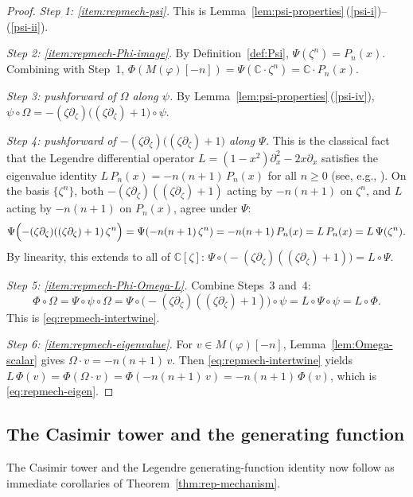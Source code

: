 \documentclass[12pt]{amsart}
\theoremstyle{plain}
\theoremstyle{definition}
\newcommand{\CC}{\mathbb{C}}
\newcommand{\Mf}{M(\varphi)}          %
\newcommand{\Om}{\Omega}              %
\begin{document}
\begin{proof}
\emph{Step 1: \ref{item:repmech-psi}.}
This is Lemma~\ref{lem:psi-properties}\,(\ref{psi-i})--(\ref{psi-ii}).

\emph{Step 2: \ref{item:repmech-Phi-image}.}
By Definition~\ref{def:Psi}, $\Psi(\zeta^n) = P_n(x)$. Combining with Step~1,
$\Phi(\Mf[-n]) = \Psi(\CC\cdot \zeta^n) = \CC\cdot P_n(x)$.

\emph{Step 3: pushforward of $\Om$ along $\psi$.}
By Lemma~\ref{lem:psi-properties}\,(\ref{psi-iv}),
$\psi\circ\Om = -(\zeta\partial_\zeta)\bigl((\zeta\partial_\zeta)+1\bigr)\circ\psi$.

\emph{Step 4: pushforward of $-(\zeta\partial_\zeta)\bigl((\zeta\partial_\zeta)+1\bigr)$
along $\Psi$.}
This is the classical fact that the Legendre differential operator
$L = (1-x^2)\partial_x^2 - 2x\partial_x$ satisfies the eigenvalue identity
$L\,P_n(x) = -n(n+1)\,P_n(x)$ for all $n\geq 0$
(see, e.g., \cite[Ch.~12, eq.~12.3.6]{Whittaker1927}).
On the basis $\{\zeta^n\}$, both
$-(\zeta\partial_\zeta)((\zeta\partial_\zeta)+1)$ acting by $-n(n+1)$ on $\zeta^n$, and
$L$ acting by $-n(n+1)$ on $P_n(x)$, agree under $\Psi$:
\[
  \Psi\Bigl(-(\zeta\partial_\zeta)((\zeta\partial_\zeta)+1)\,\zeta^n\Bigr)
  = \Psi(-n(n+1)\,\zeta^n)
  = -n(n+1)\,P_n(x)
  = L\,P_n(x)
  = L\,\Psi(\zeta^n).
\]
By linearity, this extends to all of $\CC[\zeta]$:
$\Psi\circ \bigl(-(\zeta\partial_\zeta)((\zeta\partial_\zeta)+1)\bigr) = L\circ\Psi$.

\emph{Step 5: \ref{item:repmech-Phi-Omega-L}.}
Combine Steps~3 and~4:
\[
  \Phi\circ\Om
  = \Psi\circ\psi\circ\Om
  = \Psi\circ\bigl(-(\zeta\partial_\zeta)((\zeta\partial_\zeta)+1)\bigr)\circ\psi
  = L\circ\Psi\circ\psi
  = L\circ\Phi.
\]
This is \eqref{eq:repmech-intertwine}.

\emph{Step 6: \ref{item:repmech-eigenvalue}.}
For $v\in\Mf[-n]$, Lemma~\ref{lem:Omega-scalar} gives $\Om\cdot v = -n(n+1)\,v$.
Then \eqref{eq:repmech-intertwine} yields
$L\,\Phi(v) = \Phi(\Om\cdot v) = \Phi(-n(n+1)\,v) = -n(n+1)\,\Phi(v)$,
which is \eqref{eq:repmech-eigen}.
\end{proof}

\subsection{The Casimir tower and the generating function}
\label{subsec:tower-corollaries}

The Casimir tower and the Legendre generating-function identity now
follow as immediate corollaries of Theorem~\ref{thm:rep-mechanism}.
\end{document}
